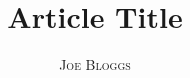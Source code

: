 \documentclass[12pt]{article}
\title{Article Title}
\author{\textsc{Joe Bloggs}}
\date{}
\begin{document}
\maketitle



\raggedright


\end{document}
